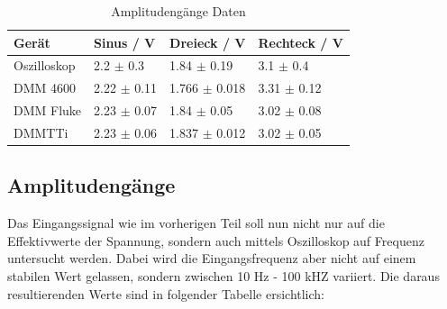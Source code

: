 \documentclass[12pt,a4paper,twoside]{article}
\begin{document}
\begin{table}[H]
    \centering
    \caption{Amplitudengänge Daten}
    \label{tab:Daten1}
    \begin{tabular}{| l | l | l | l |}
        \hline
        Gerät   & Sinus / V  & Dreieck / V & Rechteck / V \\
        \hline
        Oszilloskop & 2.2 $\pm$ 0.3  & 1.84 $\pm$ 0.19  & 3.1 $\pm$ 0.4 \\
        DMM 4600    & 2.22 $\pm$ 0.11 & 1.766 $\pm$ 0.018 & 3.31 $\pm$ 0.12 \\
        DMM Fluke   & 2.23 $\pm$ 0.07 & 1.84 $\pm$ 0.05 & 3.02 $\pm$ 0.08 \\
        DMMTTi      & 2.23 $\pm$ 0.06 & 1.837 $\pm$ 0.012 & 3.02 $\pm$ 0.05 \\
        \hline
    \end{tabular}
\end{table}


\subsection{Amplitudengänge}

Das Eingangssignal wie im vorherigen Teil soll nun nicht nur auf die Effektivwerte der Spannung, sondern auch mittels Oszilloskop auf Frequenz untersucht werden.
Dabei wird die Eingangsfrequenz aber nicht auf einem stabilen Wert gelassen, sondern zwischen 10 Hz - 100 kHZ variiert. 
Die daraus resultierenden Werte sind in folgender Tabelle ersichtlich:
\end{document}
